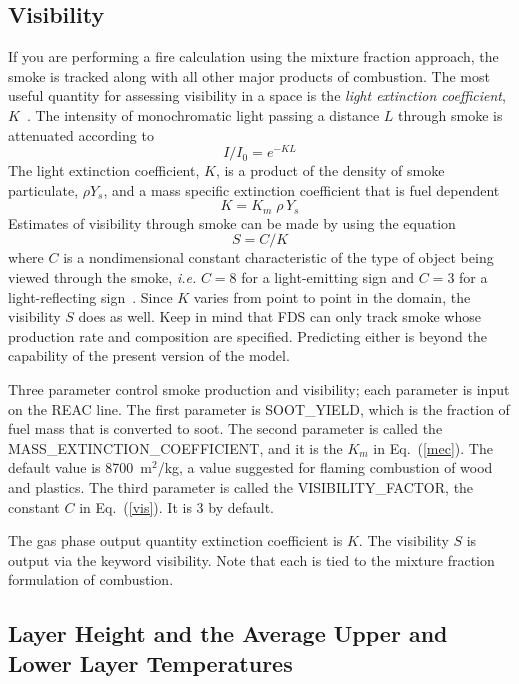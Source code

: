 \documentclass[11pt]{book}
\newcommand{\be}{\begin{equation}}
\newcommand{\ee}{\end{equation}}
\begin{document}
\subsection{Visibility}
\label{info:visibility}

If you are performing a fire calculation using the mixture fraction
approach, the smoke is tracked
along with all other major products of combustion. The most useful
quantity for assessing visibility in a space is the {\em light
extinction coefficient}, $K$~\cite{SFPE:Mulholland}. The intensity of
monochromatic light passing a distance $L$ through smoke
is attenuated according to
\be I/I_0 = e^{-KL} \ee
The light extinction coefficient, $K$, is a product of the
density of smoke particulate, $\rho Y_s$, and a mass specific
extinction coefficient that is fuel dependent
\be K = K_m \; \rho \, Y_s \label{mec} \ee
Estimates of visibility through smoke can be made by using the
equation
\be  S = C/K  \label{vis}  \ee
where $C$ is a nondimensional constant characteristic of
the type of object being viewed through the smoke, {\em i.e.}
$C=8$ for a light-emitting sign and $C=3$ for a light-reflecting
sign~\cite{SFPE:Mulholland}. Since $K$ varies from point to point in the
domain, the visibility $S$ does as well. Keep in mind that
FDS can only track smoke whose production rate and composition
are specified. Predicting either is beyond the
capability of the present version of the model.

Three parameter control smoke production and visibility; each
parameter is input on the {\ct REAC} line. The first parameter
is {\ct SOOT\_YIELD}, which is the fraction of fuel mass that
is converted to soot. The second parameter is called the
{\ct MASS\_EXTINCTION\_COEFFICIENT}, and it is the $K_m$ in
Eq.~(\ref{mec}). The default value is 8700~m$^2$/kg, a value
suggested for flaming combustion of wood and plastics.
The third parameter is called the {\ct VISIBILITY\_FACTOR}, the
constant $C$ in Eq.~(\ref{vis}). It is 3 by default.

The gas phase output quantity {\ct extinction coefficient} is $K$.
The visibility $S$ is output via the keyword {\ct visibility}. Note
that each is tied to the mixture fraction formulation of combustion.


\subsection{Layer Height and the Average Upper and Lower Layer Temperatures}
\label{info:layerheight}
\end{document}
